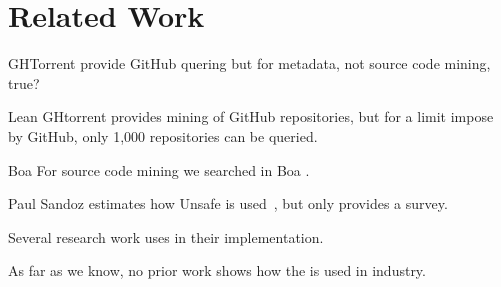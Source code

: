 
\section{Related Work} \label{sec:relatedwork}

GHTorrent \cite{Gousi13} provide GitHub quering but for metadata, not source code mining, true?

Lean GHtorrent \cite{GousiosMSR2014b} provides mining of GitHub repositories, but for a limit impose by GitHub, only 1,000 repositories can be queried.

Boa
For source code mining we searched in Boa \cite{Dyer-Nguyen-Rajan-Nguyen-13}. 


\cite{Dyer-Rajan-Nguyen-Nguyen-14}

Paul Sandoz estimates how Unsafe is used~\cite{psandoz14}, but only provides a survey.

Several research work uses \smu{} in their implementation.

As far as we know, no prior work shows how the \smu{} is used in industry.
